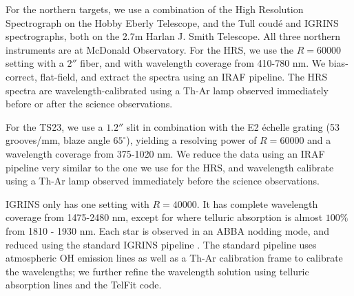 \documentclass{emulateapj}
\begin{document}
For the northern targets, we use a combination of the High Resolution Spectrograph \citep[HRS,][]{HRS} on the Hobby Eberly Telescope, and the Tull coud\'e \citep[TS23,][]{TS23} and IGRINS \citep{IGRINS} spectrographs, both on the 2.7m Harlan J. Smith Telescope. All three northern instruments are at McDonald Observatory. For the HRS, we use the $R = 60000$ setting with a $2''$ fiber, and with wavelength coverage from 410-780 nm. We bias-correct, flat-field, and extract the spectra using an IRAF pipeline. The HRS spectra are wavelength-calibrated using a Th-Ar lamp observed immediately before or after the science observations.

For the TS23, we use a $1.2''$ slit in combination with the E2 \'echelle grating (53 grooves/mm, blaze angle $65^{\circ}$), yielding a resolving power of $R=60000$ and a wavelength coverage from 375-1020 nm. We reduce the data using an IRAF pipeline very similar to the one we use for the HRS, and wavelength calibrate using a Th-Ar lamp observed immediately before the science observations.

IGRINS only has one setting with $R = 40000$. It has complete wavelength coverage from 1475-2480 nm, except for where telluric absorption is almost $100\%$ from 1810 - 1930 nm. Each star is observed in an ABBA nodding mode, and reduced using the standard IGRINS pipeline \citep{IGRINS_plp_v2}. The standard pipeline uses atmospheric OH emission lines as well as a Th-Ar calibration frame to calibrate the wavelengths; we further refine the wavelength solution using telluric absorption lines and the TelFit code.
\end{document}
